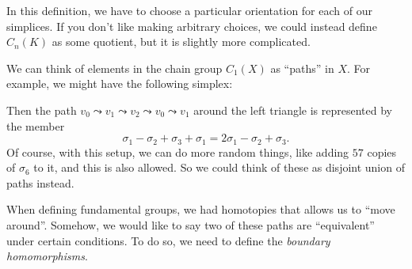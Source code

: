 \documentclass[a4paper]{article}
\begin{document}
In this definition, we have to choose a particular orientation for each of our simplices. If you don't like making arbitrary choices, we could instead define $C_n(K)$ as some quotient, but it is slightly more complicated.

\begin{eg}
  We can think of elements in the chain group $C_1(X)$ as ``paths'' in $X$. For example, we might have the following simplex:
  \begin{center}
  \end{center}
  Then the path $v_0 \leadsto v_1 \leadsto v_2 \leadsto v_0 \leadsto v_1$ around the left triangle is represented by the member
  \[
    \sigma_1 - \sigma_2 + \sigma_3 + \sigma_1 = 2\sigma_1 - \sigma_2 + \sigma_3.
  \]
  Of course, with this setup, we can do more random things, like adding $57$ copies of $\sigma_6$ to it, and this is also allowed. So we could think of these as disjoint union of paths instead.
\end{eg}

When defining fundamental groups, we had homotopies that allows us to ``move around''. Somehow, we would like to say two of these paths are ``equivalent'' under certain conditions. To do so, we need to define the \emph{boundary homomorphisms}.
\end{document}
